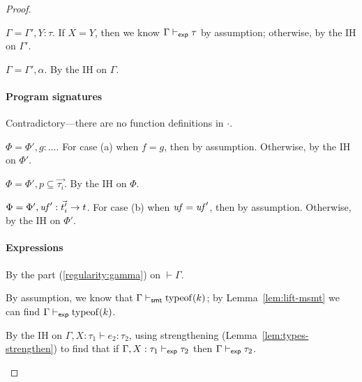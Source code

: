 \documentclass[acmsmall,screen,nonacm]{acmart}
\theoremstyle{definition}
\begin{document}
\begin{lemma}
\begin{proof}
\begin{proofcases}
  \item[(\rn{$\Gamma$-Var})] $\Gamma = \Gamma', Y:\tau$. If $X=Y$,
  then we know $\Gamma \vdash_{\mathsf{exp}} \tau$ by assumption; otherwise, by
  the IH on $\Gamma'$.

  \item[(\rn{$\Gamma$-TVar})] $\Gamma = \Gamma', \alpha$. By the IH on
  $\Gamma$.

\end{proofcases}

\paragraph*{Program signatures}
%
\begin{proofcases}

  \item[(\rn{$\Phi$-Empty})] Contradictory---there are no function definitions in $\cdot$.

  \item[(\rn{$\Phi$-Fun})] $\Phi = \Phi', g : \dots$. For case (a)
  when $f = g$, then by assumption. Otherwise, by the IH on $\Phi'$.

  \item[(\rn{$\Phi$-Rel})] $\Phi = \Phi', p \subseteq \vec{\tau_i}$. By the IH on $\Phi$.

  \item[(\rn{$\Phi$-UFun})] $\Phi = \Phi', \mathit{uf}'
  : \vec{t_i'} \rightarrow t$. For case (b) when $\mathit{uf} = \mathit{uf}'$, then by
  assumption. Otherwise, by the IH on $\Phi'$.

\end{proofcases}

\paragraph*{Expressions}
%
\begin{proofcases}

  \item[(\rn{$e$-Var})] By the part (\ref{regularity:gamma}) on $\vdash \Gamma$.

  \item[(\rn{$e$-Const})] By assumption, we know that
  $\Gamma \vdash_{\mathsf{smt}} \mathrm{typeof}(k)$; by Lemma~\ref{lem:lift-msmt}
  we can find $\Gamma \vdash_{\mathsf{exp}} \mathrm{typeof}(k)$.

  \item[(\rn{$e$-Let})] By the IH on $\Gamma, X:\tau_1 \vdash e_2
  : \tau_2$, using strengthening (Lemma~\ref{lem:types-strengthen}) to
  find that if $\Gamma, X:\tau_1 \vdash_{\mathsf{exp}} \tau_2$ then
  $\Gamma \vdash_{\mathsf{exp}} \tau_2$.


\end{proofcases}
\end{proof}
\end{lemma}
\end{document}
